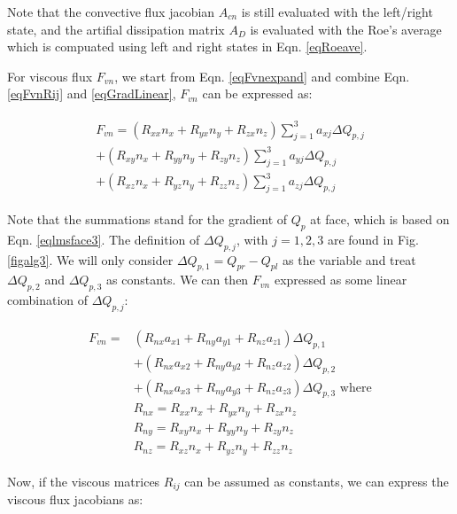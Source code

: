 \documentclass[12pt, letterpaper]{report}
\begin{document}
Note that the convective flux jacobian $A_{cn}$ is still evaluated with the left/right state, and
the artifial dissipation matrix $A_D$ is evaluated with the Roe's average which is compuated using
left and right states in Eqn. \ref{eqRoeave}. \paraspace

For viscous flux $F_{vn}$, we start from Eqn. \ref{eqFvnexpand} and combine Eqn. \ref{eqFvnRij} and
\ref{eqGradLinear}, $F_{vn}$ can be expressed as:

\begin{align}\label{eqFvnexpand2}
   \begin{split}
      F_{vn} = (R_{xx}n_x + R_{yx}n_y + R_{zx}n_z) \sum_{j=1}^3 a_{xj} \Delta Q_{p,j} \\
      + (R_{xy}n_x + R_{yy}n_y + R_{zy}n_z) \sum_{j=1}^3 a_{yj} \Delta Q_{p,j} \\
      + (R_{xz}n_x + R_{yz}n_y + R_{zz}n_z) \sum_{j=1}^3 a_{zj} \Delta Q_{p,j}
   \end{split}
\end{align}

Note that the summations stand for the gradient of $Q_p$ at face, which is based on Eqn.
\ref{eqlmsface3}. The definition of $\Delta Q_{p,j}$, with $j = 1, 2, 3$ are found in Fig.
\ref{figalg3}. We will only consider $\Delta Q_{p,1} = Q_{pr} - Q_{pl}$ as the variable and treat
$\Delta Q_{p,2}$ and $\Delta Q_{p,3}$ as constants. We can then $F_{vn}$ expressed as some linear
combination of $\Delta Q_{p,j}$:

\begin{align*}
   \begin{split}
      F_{vn} = &(R_{nx}a_{x1} + R_{ny}a_{y1} + R_{nz}a_{z1}) \Delta Q_{p,1} \\
               &+ (R_{nx}a_{x2} + R_{ny}a_{y2} + R_{nz}a_{z2}) \Delta Q_{p,2} \\
               &+ (R_{nx}a_{x3} + R_{ny}a_{y3} + R_{nz}a_{z3}) \Delta Q_{p,3} \textrm{    where} \\
               &R_{nx} = R_{xx} n_x + R_{yx} n_y + R_{zx} n_z \\
               &R_{ny} = R_{xy} n_x + R_{yy} n_y + R_{zy} n_z \\
               &R_{nz} = R_{xz} n_x + R_{yz} n_y + R_{zz} n_z
   \end{split}
\end{align*}

Now, if the viscous matrices $R_{ij}$ can be assumed as constants, we can express the viscous flux
jacobians as:
\end{document}
